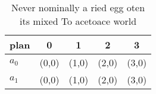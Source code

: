 \documentclass[a4paper]{article}
\begin{document}
\begin{table}
\begin{adjustbox}{width=0.5\columnwidth}
\begin{tabular}{|l|l|l|l|l|}
\hline
\textbf{plan} & \multicolumn{1}{c|}{\textbf{0}} & \multicolumn{1}{c|}{\textbf{1}} & \multicolumn{1}{c|}{\textbf{2}} & \multicolumn{1}{c|}{\textbf{3}} \\ \hline
\textbf{$a_0$}  & (0,0) & (1,0) & (2,0) & (3,0) \\ \hline
\textbf{$a_1$}  & (0,0) & (1,0) & (2,0) & (3,0) \\ \hline
\end{tabular}
\end{adjustbox}
\caption{Never nominally a ried egg oten its mixed To acetoace world
}
\end{table}
\end{document}
